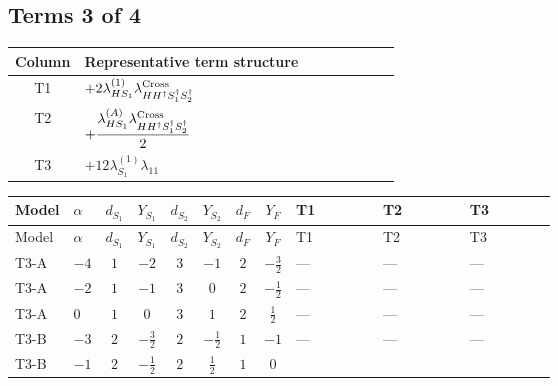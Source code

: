 \documentclass[8pt]{article}
\begin{document}
\begin{landscape}
\subsection*{Terms 3 of 4}
\begin{center}
\begin{tabular}{@{}c >{\raggedright\arraybackslash}p{0.82\linewidth}@{}}
\toprule
Column & Representative term structure \\
\midrule
T1 & \(\displaystyle +2 {\lambda_{HS_1}^{(1)}} {\lambda_{H H^\dagger S_1^\dagger S_2^\dagger}^{\rm Cross}}\) \\
\midrule
T2 & \(\displaystyle +\frac{{\lambda_{HS_1}^{(A)}} {\lambda_{H H^\dagger S_1^\dagger S_2^\dagger}^{\rm Cross}}}{2}\) \\
\midrule
T3 & \(\displaystyle +12 {\lambda_{S_1}^{(1)}} {\lambda_{11}}\) \\
\midrule
\bottomrule
\end{tabular}
\end{center}
\smallskip
\tiny
\begin{longtable}{@{}llcccccc >{\raggedright\arraybackslash}p{0.21\linewidth} >{\raggedright\arraybackslash}p{0.21\linewidth} >{\raggedright\arraybackslash}p{0.21\linewidth}@{}}
\toprule
Model & $\alpha$ & $d_{S_1}$ & $Y_{S_1}$ & $d_{S_2}$ & $Y_{S_2}$ & $d_F$ & $Y_F$ & T1 & T2 & T3 \\
\midrule
\endfirsthead
\toprule
Model & $\alpha$ & $d_{S_1}$ & $Y_{S_1}$ & $d_{S_2}$ & $Y_{S_2}$ & $d_F$ & $Y_F$ & T1 & T2 & T3 \\
\midrule
\endhead
T3-A & $-4$ & $1$ & $-2$ & $3$ & $-1$ & $2$ & $-\frac{3}{2}$ & --- & --- & --- \\
\midrule
T3-A & $-2$ & $1$ & $-1$ & $3$ & $0$ & $2$ & $-\frac{1}{2}$ & --- & --- & --- \\
\midrule
T3-A & $0$ & $1$ & $0$ & $3$ & $1$ & $2$ & $\frac{1}{2}$ & --- & --- & --- \\
\midrule
T3-B & $-3$ & $2$ & $-\frac{3}{2}$ & $2$ & $-\frac{1}{2}$ & $1$ & $-1$ & --- & --- & --- \\
\midrule
T3-B & $-1$ & $2$ & $-\frac{1}{2}$ & $2$ & $\frac{1}{2}$ & $1$ & $0$ & \scriptsize\adjustbox{max width=\linewidth}{$\begin{gathered} +2 {\lambda_{HS_1}^{(1)}} {\lambda_{H H^\dagger S_1^\dagger S_2^\dagger}^{\rm Cross}}\end{gathered}$} & \scriptsize\adjustbox{max width=\linewidth}{$\begin{gathered} +\frac{{\lambda_{HS_1}^{(A)}} {\lambda_{H H^\dagger S_1^\dagger S_2^\dagger}^{\rm Cross}}}{2}\end{gathered}$} & \scriptsize\adjustbox{max width=\linewidth}{$\begin{gathered} +12 {\lambda_{S_1}^{(1)}} {\lambda_{11}}\end{gathered}$} \\

\end{longtable}
\end{landscape}
\end{document}
